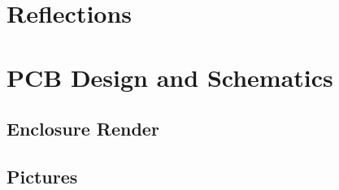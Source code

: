 \documentclass[11pt,letterpaper]{article}
\begin{document}
\section{Reflections}
\label{sec:reflections}

\clearpage

{}

\clearpage

\appendix
\section{PCB Design and Schematics}
\label{sec:appendix-schematics}

\clearpage

\begin{landscape}
\section{Enclosure Render}
\label{sec:appendix-enclosure}

\end{landscape}
\clearpage

\begin{landscape}
\section{Pictures}
\label{sec:appendix-pictures}

\end{landscape}
\clearpage

%
%
\end{document}
